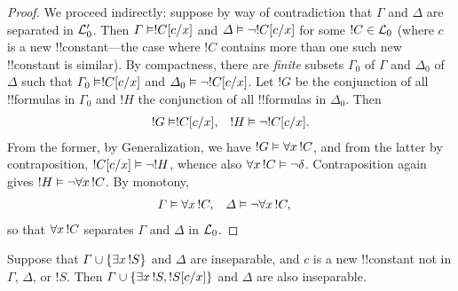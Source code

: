 \documentclass[../../../include/open-logic-section]{subfiles}
\begin{document}
\begin{proof}
We proceed indirectly: suppose by way of contradiction that $\Gamma$
and $\Delta$ are separated in $\mathcal L'_0$. Then $\Gamma \Entails
\Subst{!C}{c}{x}$ and $\Delta \Entails \lnot \Subst{!C}{c}{x}$ for some $!C \in
\mathcal L_0$ (where $c$ is a new !!{constant}---the case where $!C$
contains more than one such new !!{constant} is similar). By
compactness, there are \emph{finite} subsets $\Gamma_0$ of $\Gamma$
and $\Delta_0$ of $\Delta$ such that $\Gamma_0 \Entails \Subst{!C}{c}{x}$
and $\Delta_0 \Entails \lnot \Subst{!C}{c}{x}$. Let $!G$ be the
conjunction of all !!{formula}s in $\Gamma_0$ and $!H$ the
conjunction of all !!{formula}s in $\Delta_0$. Then
\begin{align*}
  !G & \Entails \Subst{!C}{c}{x}, & !H  \Entails \lnot \Subst{!C}{c}{x}.
\end{align*}
From the former, by Generalization, we have $!G \Entails
\lforall[x][!C]$, and from the latter by contraposition,
$\Subst{!C}{c}{x} \Entails \lnot !H$, whence also $\lforall[x][!C]
\Entails \lnot \delta$. Contraposition again gives $!H \Entails
\lnot \lforall[x][!C]$. By monotony,
\begin{align*}
  \Gamma &\Entails \lforall[x][!C], & 
  \Delta & \Entails \lnot \lforall[x][!C],
\end{align*}
so that $\lforall[x][!C]$ separates $\Gamma$ and $\Delta$ in
$\mathcal L_0$. 
\end{proof}

\begin{lem}
Suppose that $\Gamma \cup \{ \lexists[x][!S] \}$ and $\Delta$ are
inseparable, and $c$ is a new !!{constant} not in $\Gamma$, $\Delta$,
or $!S$. Then $\Gamma \cup \{ \lexists[x][!S], \Subst{!S}{c}{x} \}$
and $\Delta$ are also inseparable.
\end{lem}
\end{document}

